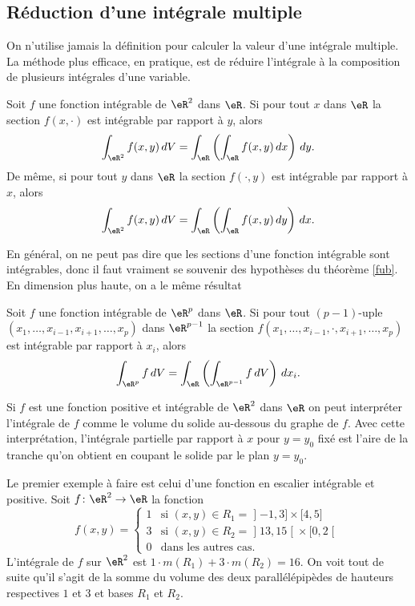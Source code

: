 \subsection{Réduction d'une intégrale multiple}
On n'utilise jamais la définition pour calculer la valeur d'une intégrale multiple. La méthode plus efficace, en pratique, est de réduire l'intégrale à la composition de plusieurs intégrales d'une variable.  
\begin{theorem}[de Fubini]\label{fub}
 Soit $f$ une fonction intégrable de $\eR^2$ dans $\eR$. Si pour tout $x$ dans $\eR$ la section $f(x,\cdot)$ est intégrable par rapport à $y$, alors
\[
\int_{\eR^2}f(x,y)\,dV=\int_{\eR}\left(\int_{\eR}f(x,y)\,dx\right)\,dy.
\]
De même, si pour tout $y$ dans $\eR$ la section $f(\cdot, y)$ est intégrable par rapport à $x$, alors
\[
\int_{\eR^2}f(x,y)\,dV=\int_{\eR}\left(\int_{\eR}f(x,y)\,dy\right)\,dx.
\] 
\end{theorem}		\label{ThoSectionINte}
En général, on ne peut pas dire que les sections d'une fonction intégrable sont intégrables, donc il faut vraiment se souvenir des hypothèses du théorème \ref{fub}. En dimension plus haute, on a le même résultat
\begin{theorem}
 Soit $f$ une fonction intégrable de $\eR^p$ dans $\eR$. Si pour tout $(p-1)$-uple $(x_1,\ldots, x_{i-1},x_{i+1}, \ldots, x_p)$ dans $\eR^{p-1}$ la section $f(x_1,\ldots, x_{i-1},\cdot,x_{i+1}, \ldots, x_p)$ est intégrable par rapport à $x_i$, alors
\[
\int_{\eR^p}f \,dV=\int_{\eR}\left(\int_{\eR^{p-1}}f \,dV\right)\,dx_i.
\]
\end{theorem}

 Si $f$ est une fonction positive et intégrable de $\eR^2$ dans $\eR$ on peut interpréter l'intégrale de $f$ comme le volume du solide au-dessous du graphe de $f$.  Avec cette interprétation,  l'intégrale partielle par rapport à $x$ pour $y=y_0$ fixé est l'aire de la tranche qu'on obtient en coupant le solide par le plan $y=y_0$.

 \begin{example}
   Le premier exemple à faire est celui d'une fonction en escalier intégrable et positive. Soit $f\colon \eR^2\to \eR$ la fonction
\begin{equation}
	f(x,y)=\begin{cases}
		1	&	\text{si }(x,y)\in R_1=\mathopen] -1 , 3 \mathclose]\times\mathopen[ 4 , 5 \mathclose]\\
		3	&	 \text{si }(x,y)\in R_2=\mathopen] 13 , 15 \mathclose[\times\mathopen[ 0 , 2 \mathclose[\\
		0	&	 \text{dans les autres cas.}
	\end{cases}
\end{equation}
L'intégrale de $f$ sur $\eR^2$ est $1\cdot m(R_1)+ 3\cdot m(R_2)= 16$. On voit tout de suite qu'il s'agit de la somme du volume des deux parallélépipèdes de hauteurs respectives $1$ et $3$ et bases $R_1$ et $R_2$. 
 \end{example}

